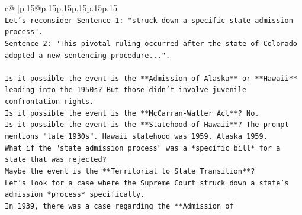 \documentclass{article}
\begin{document}
{\begin{supertabular}{c@{$\;$}|p{.15\linewidth}@{}p{.15\linewidth}p{.15\linewidth}p{.15\linewidth}p{.15\linewidth}p{.15\linewidth}}
{{{\\ 
\texttt{Let's reconsider Sentence 1: "struck down a specific state admission process".} \\
\texttt{Sentence 2: "This pivotal ruling occurred after the state of Colorado adopted a new sentencing procedure...".} \\
\\ 
\texttt{Is it possible the event is the **Admission of Alaska** or **Hawaii** leading into the 1950s? But those didn't involve juvenile confrontation rights.} \\
\texttt{Is it possible the event is the **McCarran{-}Walter Act**? No.} \\
\texttt{Is it possible the event is the **Statehood of Hawaii**? The prompt mentions "late 1930s". Hawaii statehood was 1959. Alaska 1959.} \\
\texttt{What if the "state admission process" was a *specific bill* for a state that was rejected?} \\
\texttt{Maybe the event is the **Territorial to State Transition**?} \\
\texttt{Let's look for a case where the Supreme Court struck down a state's admission *process* specifically.} \\
\texttt{In 1939, there was a case regarding the **Admission of} \\
            }
        }
    }
     \\ \\


\end{supertabular}}
\end{document}
